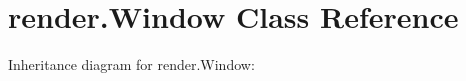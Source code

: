 \hypertarget{classrender_1_1Window}{}\section{render.\+Window Class Reference}
\label{classrender_1_1Window}


Inheritance diagram for render.\+Window\+:
